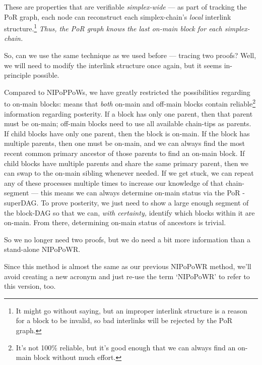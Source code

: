 These are properties that are verifiable \emph{simplex-wide} --- as part of tracking the PoR graph, each node can reconstruct each simplex-chain's \emph{local} interlink structure.\footnote{
    It might go without saying, but an improper interlink structure is a reason for a block to be invalid, so bad interlinks will be rejected by the PoR graph.
}
\emph{Thus, the PoR graph knows the last on-main block for each simplex-chain.}

So, can we use the same technique as we used before --- tracing two proofs?
Well, we will need to modify the interlink structure once again, but it seems in-principle possible.

Compared to NIPoPPoWs, we have greatly restricted the possibilities regarding to on-main blocks: \AxOfUnifiedAncestry means that \emph{both} on-main and off-main blocks contain reliable\footnote{
    It's not 100\% reliable, but it's good enough that we can always find an on-main block without much effort.
} information regarding posterity.
If a block has only one parent, then that parent must be on-main; off-main blocks need to use all available chain-tips as parents.
If child blocks have only one parent, then the block is on-main.
If the block has multiple parents, then one must be on-main, and we can always find the most recent common primary ancestor of those parents to find an on-main block.
If child blocks have multiple parents and share the same primary parent, then we can swap to the on-main sibling whenever needed.
If we get stuck, we can repeat any of these processes multiple times to increase our knowledge of that chain-segment --- this means we can always determine on-main status via the PoR \mu-superDAG.
To prove posterity, we just need to show a large enough segment of the block-DAG so that we can, \emph{with certainty,} identify which blocks within it are on-main.
From there, determining on-main status of ancestors is trivial.

So we no longer need two proofs, but we do need a bit more information than a stand-alone NIPoPoWR.

Since this method is almost the same as our previous NIPoPoWR method, we'll avoid creating a new acronym and just re-use the term `NIPoPoWR' to refer to this version, too.


